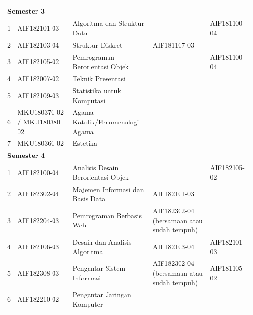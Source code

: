 \begin{table}[H]
\begin{tabular}{|p{0.5cm}|p{2.85cm}|p{4.95cm}|p{2.7cm}|p{2.7cm}|}
\multicolumn{5}{|l|}{\textbf{Semester 3}} \\ \hline
1 & AIF182101-03 & Algoritma dan Struktur Data &  & AIF181100-04 \\ \hline
2 & AIF182103-04 & Struktur Diskret & AIF181107-03 &  \\ \hline
3 & AIF182105-02 & Pemrograman Berorientasi Objek &  & AIF181100-04 \\ \hline
4 & AIF182007-02 & Teknik Presentasi &  &  \\ \hline
5 & AIF182109-03 & Statistika untuk Komputasi &  &  \\ \hline
6 & MKU180370-02 / MKU180380-02 & Agama Katolik/Fenomenologi Agama &  &  \\ \hline
7 & MKU180360-02 & Estetika &  &  \\ \hline
\multicolumn{5}{|l|}{\textbf{Semester 4}} \\ \hline
1 & AIF182100-04 & Analisis Desain Berorientasi Objek &  & AIF182105-02 \\ \hline
2 & AIF182302-04 & Majemen Informasi dan Basis Data & AIF182101-03 &  \\ \hline
3 & AIF182204-03 & Pemrograman Berbasis Web & AIF182302-04 (bersamaan atau sudah tempuh) &  \\ \hline
4 & AIF182106-03 & Desain dan Analisis Algoritma & AIF182103-04 & AIF182101-03  \\ \hline
5 & AIF182308-03 & Pengantar Sistem Informasi & AIF182302-04 (bersamaan atau sudah tempuh) & AIF181105-02 \\ \hline
6 & AIF182210-02 & Pengantar Jaringan Komputer & & \\ \hline
		\end{tabular}
	\label{tab:DaftarMataKuliahWajibDanPrasyaratnya}
\end{table}

